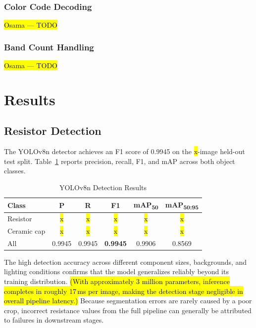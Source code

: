 \documentclass[conference]{IEEEtran}
\newcommand{\debatable}[1]{\hl{(#1)}}
\begin{document}
\subsubsection{Color Code Decoding}
\hl{Osama — TODO}

\subsubsection{Band Count Handling}
\hl{Osama — TODO}
\section{Results}
\label{sec:results}
 
\subsection{Resistor Detection}
\label{sec:results_yolo}
 
The YOLOv8n detector achieves an F1 score of 0.9945 on the
\hl{x}-image held-out test split.
Table~\ref{tab:yolo_results} reports precision, recall, F1,
and mAP across both object classes.
 
\begin{table}[!t]
  \caption{YOLOv8n Detection Results}
  \label{tab:yolo_results}
  \centering
  \renewcommand{\arraystretch}{1.15}
  \begin{tabular}{@{}lccccc@{}}
    \toprule
    \textbf{Class} & \textbf{P} & \textbf{R}
        & \textbf{F1} & \textbf{mAP\textsubscript{50}}
        & \textbf{mAP\textsubscript{50:95}} \\
    \midrule
    Resistor    & \hl{x} & \hl{x} & \hl{x} & \hl{x} & \hl{x} \\
    Ceramic cap & \hl{x} & \hl{x} & \hl{x} & \hl{x} & \hl{x} \\
    \midrule
    All & 0.9945 & 0.9945 & \textbf{0.9945} & 0.9906 & 0.8569 \\
    \bottomrule
  \end{tabular}
\end{table}
 
The high detection accuracy across different component sizes,
backgrounds, and lighting conditions confirms that the model
generalizes reliably beyond its training distribution.
\debatable{With approximately 3 million parameters, inference
completes in roughly 17\,ms per image, making the detection
stage negligible in overall pipeline latency.}
Because segmentation errors are rarely caused by a poor crop,
incorrect resistance values from the full pipeline can
generally be attributed to failures in downstream stages.
 
\end{document}

